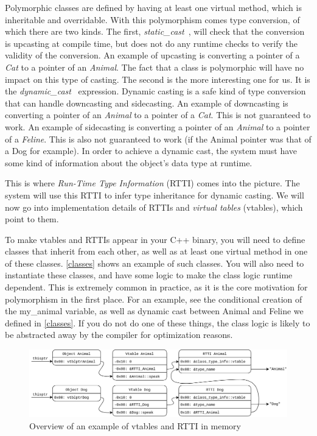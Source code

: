 \documentclass[a4paper,11pt,oneside]{report}
\begin{document}
Polymorphic classes are defined by having at least one virtual method, which is 
inheritable and overridable.
With this polymorphism comes type conversion, of which there are two kinds.
The first, \emph{static\_cast}~\cite{staticcast}, will check that the
conversion is upcasting at compile time,
but does not do any runtime checks to verify the validity of the conversion.
An example of upcasting is converting a pointer of a \emph{Cat} to a pointer
of an \emph{Animal}.
The fact that a class is polymorphic will have no impact on this type of 
casting.
The second is the more interesting one for us. It is the 
\emph{dynamic\_cast}~\cite{dynamiccast} expression.
Dynamic casting is a safe kind of type conversion that can handle downcasting 
and sidecasting.
An example of downcasting is converting a pointer of an \emph{Animal} to a
pointer of a \emph{Cat}. This is not guaranteed to work.
An example of sidecasting is converting a pointer of an \emph{Animal} to a
pointer of a \emph{Feline}. This is also not guaranteed to work (if the
Animal pointer was that of a Dog for example).
In order to achieve a dynamic cast, the system must have some kind of
information about the object's data type at runtime.

This is where \emph{Run-Time Type Information} (RTTI) comes into the picture.
The system will use this RTTI to infer type inheritance for dynamic casting.
We will now go into implementation details of RTTIs and \emph{virtual tables}
(vtables), which point to them.

To make vtables and RTTIs appear in your C++ binary, you will need to define
classes that inherit from each other, as well as at least one virtual method
in one of these classes.
\autoref{classes} shows an example of such classes.
You will also need to instantiate these classes, and have some logic to make
the class logic runtime dependent. 
This is extremely common in practice, as it is the core motivation for
polymorphism in the first place.
For an example, see the conditional creation of the my\_animal variable, as
well as dynamic cast between Animal and Feline we defined in \autoref{classes}.
If you do not do one of these things, the class logic is likely to be abstracted
away by the compiler for optimization reasons.

\begin{figure}

\includegraphics[width=16cm]{RTTI_graph.png}
\caption{Overview of an example of vtables and RTTI in memory}
\label{rttigraph}

\end{figure}
\end{document}
